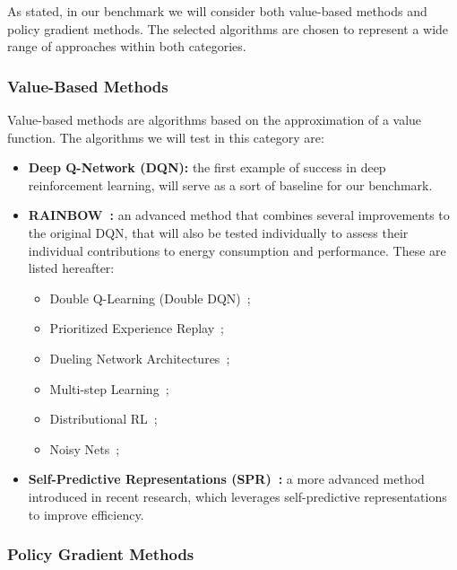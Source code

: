 As stated, in our benchmark we will consider both value-based methods and policy gradient methods. The selected algorithms are chosen to represent a wide range of approaches within both categories.

\subsubsection{Value-Based Methods}

Value-based methods are algorithms based on the approximation of a value function. The algorithms we will test in this category are:
\begin{itemize}
	\item \textbf{Deep Q-Network (DQN):} the first example of success in deep reinforcement learning, will serve as a sort of baseline for our benchmark.
	\item \textbf{RAINBOW~\cite{hessel:rainbow}:} an advanced method that combines several improvements to the original DQN, that will also be tested individually to assess their individual contributions to energy consumption and performance. These are listed hereafter:
	\begin{itemize}
		\item Double Q-Learning (Double DQN)~\cite{van:double_q};
		\item Prioritized Experience Replay~\cite{schaul:prioritized};
		\item Dueling Network Architectures~\cite{wang:dueling};
		\item Multi-step Learning~\cite{peng:incremental};
		\item Distributional RL~\cite{bellemare:distributional};
		\item Noisy Nets~\cite{fortunato:noisy};
	\end{itemize}
	\item \textbf{Self-Predictive Representations (SPR)~\cite{schwarzer:spr}:} a more advanced method introduced in recent research, which leverages self-predictive representations to improve efficiency.
\end{itemize}

\subsubsection{Policy Gradient Methods}

